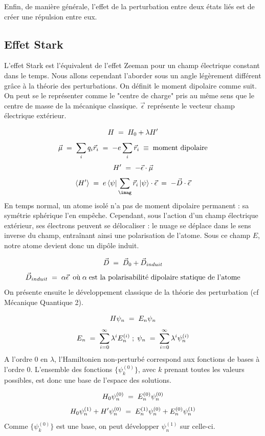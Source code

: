 Enfin, de manière générale, l'effet de la perturbation entre deux états liés est de créer une répulsion entre eux.




\subsection{Effet Stark}

L'effet Stark est l'équivalent de l'effet Zeeman pour un champ électrique constant dans le temps. Nous allons cependant l'aborder sous un angle légèrement différent grâce à la théorie des perturbations. On définit le moment dipolaire comme suit. On peut se le représenter comme le "centre de charge" pris au même sens que le centre de masse de la mécanique classique. $\vec{\epsilon}$ représente le vecteur champ électrique extérieur.

\[
    H \; = \; H_0 + \lambda H'
\]
\[
    \vec{\mu} \; = \; \sum_i q_i \vec{r}_i \; = \; -e\sum_i \vec{r}_i\;\equiv\; \textrm{moment dipolaire}
\]
\[
    H' \; = \; -\vec{\epsilon}\cdot\vec{\mu}
\]
\[
    \expval{H'} \eq e\bra{\psi}\sum_\imag\vec{r}_i\ket{\psi}\cdot \vec{\epsilon} \eq -\vec{D}\cdot\vec{\epsilon}
\]
En temps normal, un atome isolé n'a pas de moment dipolaire permanent : sa symétrie sphérique l'en empêche. Cependant, sous l'action d'un champ électrique extérieur, ses électrons peuvent se délocaliser : le nuage se déplace dans le sens inverse du champ, entraînant ainsi une polarisation de l'atome. Sous ce champ $E$, notre atome devient donc un dipôle induit.

\[
    \vec{D} \; = \; \vec{D}_0 + \vec{D}_{induit}
\]
\[
    \vec{D}_{induit} \; = \; \alpha \vec{\epsilon} \;\; \text{où}\; \alpha \; \text{est la polarisabilité dipolaire statique de l'atome}
\]
On présente ensuite le développement classique de la théorie des perturbation (cf Mécanique Quantique 2).

\[
    H\psi_n \; = \; E_n \psi_n
\]
\[
    E_n \; = \; \sum_{i=0}^{\infty} \lambda^i E_n^{(i)}\; ; \; \psi_n \; = \; \sum_{i=0}^{\infty} \lambda^i \psi_n^{(i)}
\]
A l'ordre 0 en $\lambda$, l'Hamiltonien non-perturbé correspond aux fonctions de bases à l'ordre 0. L'ensemble des fonctions $\{\psi_k^{(0)}\}$, avec $k$ prenant toutes les valeurs possibles, est donc une base de l'espace des solutions.

\[
    H_0 \psi_n^{(0)} \; = \; E_n^{(0)} \psi_n^{(0)}
\]
\[
    H_0 \psi_n^{(1)} + H' \psi_n^{(0)} \; = \; E_n^{(1)} \psi_n^{(0)} + E_n^{(0)} \psi_n^{(1)}
\]
Comme $\{\psi_k^{(0)}\}$ est une base, on peut développer $\psi_n^{(1)}$ sur celle-ci.

